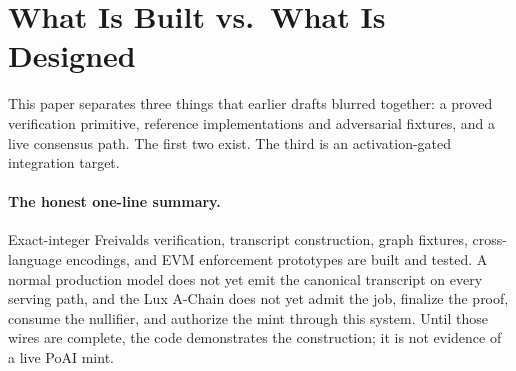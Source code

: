 \section{What Is Built vs.\ What Is Designed}
\label{sec:status-summary}

This paper separates three things that earlier drafts blurred together: a proved
verification primitive, reference implementations and adversarial fixtures, and a live
consensus path. The first two exist. The third is an activation-gated integration target.

\paragraph{The honest one-line summary.} Exact-integer Freivalds verification, transcript
construction, graph fixtures, cross-language encodings, and EVM enforcement prototypes are
built and tested. A normal production model does not yet emit the canonical transcript on
every serving path, and the Lux A-Chain does not yet admit the job, finalize the proof,
consume the nullifier, and authorize the mint through this system. Until those wires are
complete, the code demonstrates the construction; it is not evidence of a live PoAI mint.

